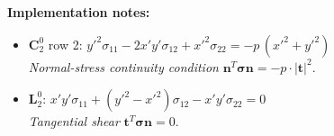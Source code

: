 \textbf{Implementation notes:}
\begin{itemize}
  \item $\boldsymbol{C}_2^0$ row 2: $y'^2 \sigma_{11} - 2 x' y' \sigma_{12} + x'^2 \sigma_{22} = -p\,(x'^2 + y'^2)$\\
    \emph{Normal-stress continuity condition} $\boldsymbol{n}^T \boldsymbol{\sigma} \boldsymbol{n} = -p \cdot |\boldsymbol{t}|^2$.
  \item $\boldsymbol{L}_2^0$: $x' y' \sigma_{11} + (y'^2 - x'^2) \sigma_{12} - x' y' \sigma_{22} = 0$\\
    \emph{Tangential shear} $\boldsymbol{t}^T \boldsymbol{\sigma} \boldsymbol{n} = 0$.
\end{itemize}
